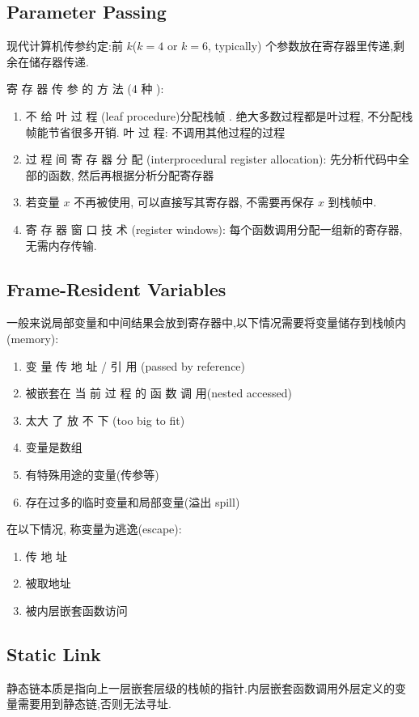 \subsection{Parameter Passing}
现代计算机传参约定:前 $k$($k=4$ or $k=6$, typically) 个参数放在寄存器里传递,剩余在储存器传递.

寄 存 器 传 参 的 方 法 (4 种 ):
\begin{enumerate}
    \item 不 给 叶 过 程 (leaf procedure)分配栈帧 . 绝大多数过程都是叶过程, 不分配栈帧能节省很多开销.
    \subitem  叶 过 程: 不调用其他过程的过程
    \item 过 程 间 寄 存 器 分 配 (interprocedural register allocation): 先分析代码中全部的函数, 然后再根据分析分配寄存器
    \item 若变量 $x$ 不再被使用, 可以直接写其寄存器, 不需要再保存 $x$ 到栈帧中. 
    \item  寄 存 器 窗 口 技 术 (register windows): 每个函数调用分配一组新的寄存器, 无需内存传输.
\end{enumerate}

\subsection{Frame-Resident Variables}
一般来说局部变量和中间结果会放到寄存器中,以下情况需要将变量储存到栈帧内(memory): 
\begin{enumerate}
    \item 变 量 传 地 址 / 引 用 (passed by reference) 
    \item 被嵌套在 当 前 过 程 的 函 数 调 用(nested accessed) 
    \item 太大 了 放 不 下 (too big to fit)
    \item 变量是数组
    \item 有特殊用途的变量(传参等) 
    \item 存在过多的临时变量和局部变量(溢出 spill)
\end{enumerate}

在以下情况, 称变量为逃逸(escape):
\begin{enumerate}
    \item 传 地 址 
    \item 被取地址
    \item 被内层嵌套函数访问
\end{enumerate}


\subsection{Static Link}
静态链本质是指向上一层嵌套层级的栈帧的指针.内层嵌套函数调用外层定义的变量需要用到静态链,否则无法寻址.

